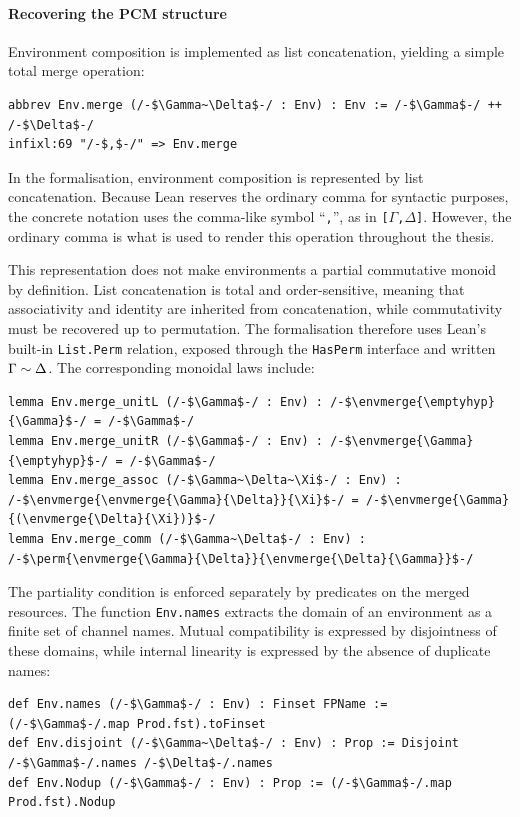 \paragraph{Recovering the PCM structure}
Environment composition is implemented as list concatenation, yielding a simple total merge operation:

\begin{lstlisting}[language=Lean4]
abbrev Env.merge (/-$\Gamma~\Delta$-/ : Env) : Env := /-$\Gamma$-/ ++ /-$\Delta$-/
infixl:69 "/-$,$-/" => Env.merge
\end{lstlisting}

In the formalisation, environment composition is represented by list concatenation. Because Lean reserves the ordinary comma for syntactic purposes, the concrete notation uses the comma-like symbol ``\texttt{‚}'', as in \texttt{[$\Gamma$‚$\Delta$]}. However, the ordinary comma is what is used to render this operation throughout the thesis.

This representation does not make environments a partial commutative monoid by definition. List concatenation is total and order-sensitive, meaning that associativity and identity are inherited from concatenation, while commutativity must be recovered up to permutation. The formalisation therefore uses Lean's built-in \texttt{List.Perm} relation, exposed through the \texttt{HasPerm} interface and written $\Gamma \sim \Delta$. The corresponding monoidal laws include:

\begin{lstlisting}[language=Lean4] 
lemma Env.merge_unitL (/-$\Gamma$-/ : Env) : /-$\envmerge{\emptyhyp}{\Gamma}$-/ = /-$\Gamma$-/ 
lemma Env.merge_unitR (/-$\Gamma$-/ : Env) : /-$\envmerge{\Gamma}{\emptyhyp}$-/ = /-$\Gamma$-/
lemma Env.merge_assoc (/-$\Gamma~\Delta~\Xi$-/ : Env) : /-$\envmerge{\envmerge{\Gamma}{\Delta}}{\Xi}$-/ = /-$\envmerge{\Gamma}{(\envmerge{\Delta}{\Xi})}$-/ 
lemma Env.merge_comm (/-$\Gamma~\Delta$-/ : Env) : /-$\perm{\envmerge{\Gamma}{\Delta}}{\envmerge{\Delta}{\Gamma}}$-/
\end{lstlisting}

The partiality condition is enforced separately by predicates on the merged resources. The function \texttt{Env.names} extracts the domain of an environment as a finite set of channel names. Mutual compatibility is expressed by disjointness of these domains, while internal linearity is expressed by the absence of duplicate names:

\begin{lstlisting}[language=Lean4]
def Env.names (/-$\Gamma$-/ : Env) : Finset FPName := (/-$\Gamma$-/.map Prod.fst).toFinset 
def Env.disjoint (/-$\Gamma~\Delta$-/ : Env) : Prop := Disjoint /-$\Gamma$-/.names /-$\Delta$-/.names
def Env.Nodup (/-$\Gamma$-/ : Env) : Prop := (/-$\Gamma$-/.map Prod.fst).Nodup
\end{lstlisting}

